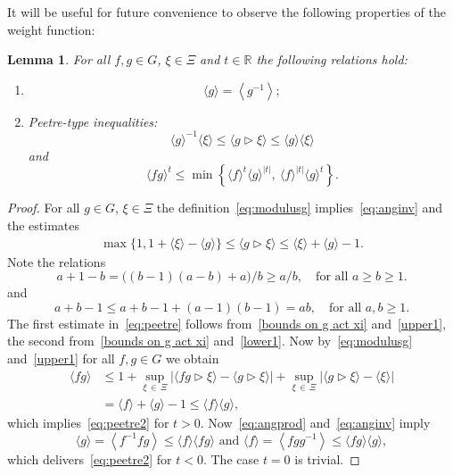 \documentclass[10pt]{amsart}
\newtheorem{lemm}[theo]{Lemma}\newtheorem{prop}[theo]{Proposition}\newtheorem{coro}[theo]{Corollary}\newtheorem{conj}[theo]{Conjecture}
\theoremstyle{definition}\newtheorem{defi}[theo]{Definition}\newtheorem{rema}[theo]{Remark}\newtheorem{exam}[theo]{Example}\newtheorem{nota}[theo]{Notation}
\newcommand{\R}{\mathbb R}
\newcommand{\act}{\triangleright}
\newcommand{\abs}[1]{\left\lvert #1 \right\rvert}
\newcommand{\ang}[1]{\langle #1 \rangle}
\begin{document}
It will be useful for future convenience to observe the following properties of the weight function:
\begin{lemm}
For all $f,g \in G$, $\xi \in \Xi$ and $t \in\R$ the following relations hold:
\begin{enumerate}
\item
\begin{equation}
\ang g = \left\langle g^{-1}\right\rangle;\label{eq:anginv}
\end{equation}
\item Peetre-type inequalities:
\begin{equation}
\ang g^{-1} \ang \xi \le \ang{g \act \xi} \le \ang g \ang \xi\label{eq:peetre}
\end{equation}
and
\begin{equation}
\ang{fg}^t \le \min\left\{\ang f^t \ang g^{\abs t}, \ \ang f^{\abs t} \ang g^{t}\right\}.\label{eq:peetre2}
\end{equation}
\end{enumerate}
\end{lemm}

\begin{proof}
For all $g \in G$, $\xi \in \Xi$ the definition~\eqref{eq:modulusg} implies~\eqref{eq:anginv} and the estimates
\begin{align}\label{bounds on g act xi}
\max\big\{1, 1 +\ang{\xi} -\ang{g}\big\} \leq \ang{g\act \xi} \leq \ang\xi +\ang g -1.
\end{align}
Note the relations
\begin{equation}\label{upper1}
a +1 -b =\big((b -1)(a -b) +a\big)/b \geq a/b,\quad \text{for all } a\geq b\geq 1.
\end{equation}
and
\begin{equation}\label{lower1}
a +b -1 \leq a +b -1 +(a -1)(b -1) =ab,\quad \text{for all } a, b\geq 1.
\end{equation}
The first estimate in~\eqref{eq:peetre} follows from~\eqref{bounds on g act xi} and~\eqref{upper1}, the second from~\eqref{bounds on g act xi} and~\eqref{lower1}. Now by~\eqref{eq:modulusg} and~\eqref{upper1} for all $f,g \in G$ we obtain
\begin{equation}\label{eq:angprod}
\begin{aligned}
\ang{fg}&\leq 1 +\sup_{\xi\,\in\,\Xi} \left|\ang{fg\act\xi} - \ang{g\act \xi}\right| +\sup_{\xi\,\in\,\Xi}\left|\ang{g\act\xi} - \ang{\xi}\right| \\
&=\ang f +\ang g -1 \leq \ang f\ang g,
\end{aligned}
\end{equation}
which implies~\eqref{eq:peetre2} for $t >0$. Now~\eqref{eq:angprod} and~\eqref{eq:anginv} imply
\begin{equation}
\ang g =\left\langle f^{-1}fg\right\rangle \leq\ang f\ang{fg}\text{ and }\ang f =\left\langle fgg^{-1}\right\rangle \leq \ang{fg}\ang{g},
\end{equation}
which delivers~\eqref{eq:peetre2} for $t < 0$. The case $t = 0$ is trivial.
\end{proof}
\end{document}
